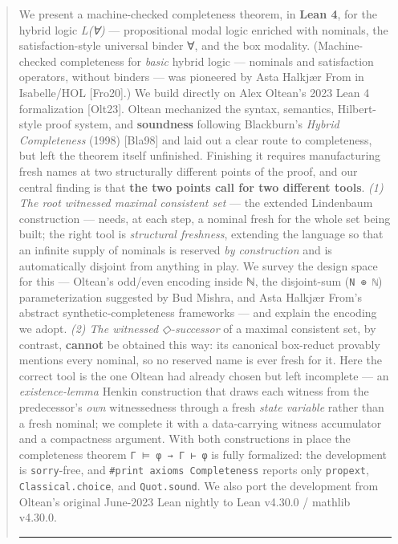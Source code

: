 \documentclass[11pt,a4paper]{article}
\renewcommand{\_}{\origtextunderscore\allowbreak}
\begin{document}
\begin{abstract}
        We present a machine-checked completeness theorem, in \textbf{Lean 4}, for the hybrid logic \emph{L(∀)} --- propositional modal logic enriched with nominals, the satisfaction-style universal binder ∀, and the box modality. (Machine-checked completeness for \emph{basic} hybrid logic --- nominals and satisfaction operators, without binders --- was pioneered by Asta Halkjær From in Isabelle/HOL {[}Fro20{]}.) We build directly on Alex Oltean's 2023 Lean 4 formalization {[}Olt23{]}. Oltean mechanized the syntax, semantics, Hilbert-style proof system, and \textbf{soundness} following Blackburn's \emph{Hybrid Completeness} (1998) {[}Bla98{]} and laid out a clear route to completeness, but left the theorem itself unfinished. Finishing it requires manufacturing fresh names at two structurally different points of the proof, and our central finding is that \textbf{the two points call for two different tools}. \emph{(1) The root witnessed maximal consistent set} --- the extended Lindenbaum construction --- needs, at each step, a nominal fresh for the whole set being built; the right tool is \emph{structural freshness}, extending the language so that an infinite supply of nominals is reserved \emph{by construction} and is automatically disjoint from anything in play. We survey the design space for this --- Oltean's odd/even encoding inside ℕ, the disjoint-sum (\texttt{N\ ⊕\ ℕ}) parameterization suggested by Bud Mishra, and Asta Halkjær From's abstract synthetic-completeness frameworks --- and explain the encoding we adopt. \emph{(2) The witnessed ◇-successor} of a maximal consistent set, by contrast, \textbf{cannot} be obtained this way: its canonical box-reduct provably mentions every nominal, so no reserved name is ever fresh for it. Here the correct tool is the one Oltean had already chosen but left incomplete --- an \emph{existence-lemma} Henkin construction that draws each witness from the predecessor's \emph{own} witnessedness through a fresh \emph{state variable} rather than a fresh nominal; we complete it with a data-carrying witness accumulator and a compactness argument. With both constructions in place the completeness theorem \texttt{Γ\ ⊨\ φ\ →\ Γ\ ⊢\ φ} is fully formalized: the development is \texttt{sorry}-free, and \texttt{\#print\ axioms\ Completeness} reports only \texttt{propext}, \texttt{Classical.choice}, and \texttt{Quot.sound}. We also port the development from Oltean's original June-2023 Lean nightly to Lean v4.30.0 / mathlib v4.30.0.

\begin{center}\rule{0.5\linewidth}{0.5pt}\end{center}
        \end{abstract}
\end{document}
